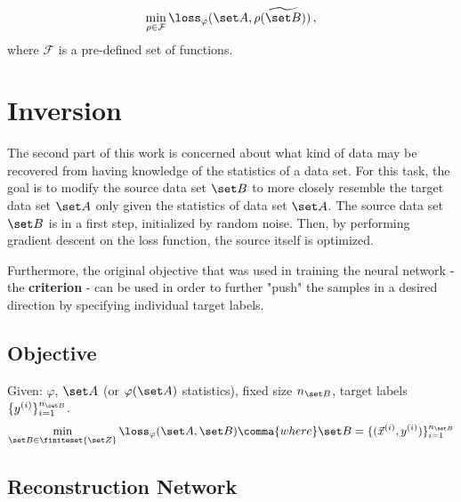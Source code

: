 \[
    \min_{\rho \in \mathcal{F}} \loss _\varphi (\set A, \rho(\widetilde{\set B})) \,,
\]
where $\mathcal F$ is a pre-defined set of functions.








\section{Inversion}
\label{sec:Inversion}



The second part of this work is concerned about what kind of data may be recovered from 
having knowledge of the statistics of a data set.
For this task, the goal is to modify the source data set $\set B$ to more closely resemble
the target data set $\set A$ only given the statistics of data set $\set A$.
The source data set $\set B$ is in a first step, initialized by random noise.
Then, by performing gradient descent on the loss function, the source itself is optimized.

Furthermore, the original objective that was used in training the neural network - the \textbf{criterion} - can be used in order to further "push" the samples in a desired direction by specifying individual target labels.



\subsection{Objective}
Given: $\varphi$, $\set A$ (or $\varphi(\set A)$ statistics), 
fixed size $n_{\set B}$, target labels $\{y^{(i)}\}_{i=1}^{n_{\set B}}$.
\[
    \min_{\set B \in \finiteset {\set Z}} \loss _\varphi (\set A, \set B) \comma{where} 
    \set B = \{(\vec x^{(i)}, y^{(i)})\}_{i=1}^{n_{\set B}}
\]
    

\subsection{Reconstruction Network}

\begin{minipage}{0.5\textwidth}

\end{minipage}
\begin{minipage}{0.5\textwidth}

\end{minipage}





